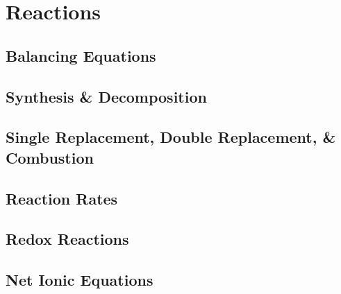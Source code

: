 \documentclass[../hchem.tex]{subfiles}
\begin{document}
\chapter{Reactions}
\section{Balancing Equations}
\section{Synthesis \& Decomposition}
\section{Single Replacement, Double Replacement, \& Combustion}
\section{Reaction Rates}
\section{Redox Reactions}
\section{Net Ionic Equations}
\end{document}
